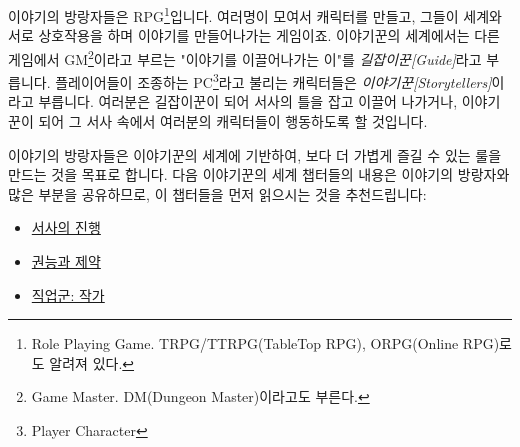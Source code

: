 \documentclass{report}
\begin{document}
	이야기의 방랑자들은 RPG\footnote{Role Playing Game. TRPG/TTRPG(TableTop RPG), ORPG(Online RPG)로도 알려져 있다.}입니다. 여러명이 모여서 캐릭터를 만들고, 그들이 세계와 서로 상호작용을 하며 이야기를 만들어나가는 게임이죠. 이야기꾼의 세계에서는 다른 게임에서 GM\footnote{Game Master. DM(Dungeon Master)이라고도 부른다.}이라고 부르는 "이야기를 이끌어나가는 이"를 \emph{길잡이꾼[Guide]}라고 부릅니다. 플레이어들이 조종하는 PC\footnote{Player Character}라고 불리는 캐릭터들은 \emph{이야기꾼[Storytellers]}이라고 부릅니다. 여러분은 길잡이꾼이 되어 서사의 틀을 잡고 이끌어 나가거나, 이야기꾼이 되어 그 서사 속에서 여러분의 캐릭터들이 행동하도록 할 것입니다.
	
	이야기의 방랑자들은 이야기꾼의 세계에 기반하여, 보다 더 가볍게 즐길 수 있는 룰을 만드는 것을 목표로 합니다. 다음 이야기꾼의 세계 챕터들의 내용은 이야기의 방랑자와 많은 부분을 공유하므로, 이 챕터들을 먼저 읽으시는 것을 추천드립니다:
	\begin{itemize}
		\item \hyperlink{story-progression}{서사의 진행}
		\item \hyperlink{power-limit}{권능과 제약}
		\item \hyperlink{author}{직업군: 작가}
	\end{itemize}
\end{document}
